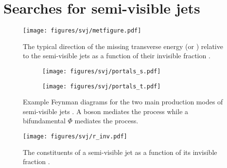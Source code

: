 \section{Searches for semi-visible jets}
\label{sec:theory_svj}


\begin{figure}[htbp]
\centering
\texttt{[image: figures/svj/metfigure.pdf]}
\caption[The typical direction of the missing transverse energy relative to the semi-visible jets as a function of the invisible fraction \rinv]{The typical direction of the missing transverse energy \ETslash\xspace (or \ptmiss) relative to the semi-visible jets as a function of their invisible fraction \rinv \cite{Cohen:2017pzm}.}
\label{fig:theory_svj_met_dir}
\end{figure}

\begin{figure}[htbp]
    \centering
    \begin{subfigure}[c]{0.45\textwidth}
    \centering
        \texttt{[image: figures/svj/portals\_s.pdf]}
        \caption{\schannel}
    \end{subfigure}
    \hfill
    \begin{subfigure}[c]{0.45\textwidth}
    \centering
        \texttt{[image: figures/svj/portals\_t.pdf]}
        \caption{\tchannel}
    \end{subfigure}
\caption[Example Feynman diagrams for the two main production modes of semi-visible jets. A \PZprime  boson mediates the \schannel process while a bifundamental $\Phi$ mediates the \tchannel process]{Example Feynman diagrams for the two main production modes of semi-visible jets \cite{Cohen:2017pzm}. A \PZprime  boson mediates the \schannel process while a bifundamental $\Phi$ mediates the \tchannel process.}
\label{fig:theory_svj_portals}
\end{figure}

\begin{figure}[htbp]
\centering
\texttt{[image: figures/svj/r\_inv.pdf]}
\caption[The constituents of a semi-visible jet as a function of its invisible fraction]{The constituents of a semi-visible jet as a function of its invisible fraction \rinv \cite{Cohen:2017pzm}.}
\label{fig:theory_svj_rinv}
\end{figure}
